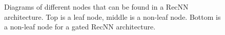 \begin{figure}
    \begin{center}
    
    
    
    \caption{Diagrams of different nodes that can be found in a RecNN architecture. Top is a leaf node, middle is a non-leaf node. Bottom is a non-leaf node for a gated RecNN architecture.}
    \label{fig:recnn_nodes}
    \end{center}
\end{figure}


